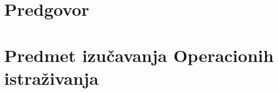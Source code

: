 \documentclass[a4paper, utf8, 11pt, colorlinks]{book}
\begin{document}

 
\newpage
 
\tableofcontents

\newpage
\chapter*{Predgovor}



\chapter{Predmet izučavanja Operacionih istraživanja}
\end{document}
